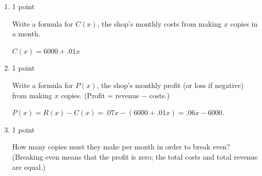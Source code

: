 \documentclass{article}
\begin{document}
\begin{enumerate}
\begin{enumerate}
    \begin{problem}[\vfill]
      Write a formula for $R(x)$, the shop's monthly revenue from
      making $x$ copies in a month.
    \end{problem}

    \begin{solution} 
      $\boxed{R(x) = .07 x}$ 
    \end{solution}

  \item

    \begin{grading}
      1 point
    \end{grading}

    \begin{problem}[\vfill]
      Write a formula for $C(x)$, the shop's monthly costs from making
      $x$ copies in a month.
    \end{problem}

    \begin{solution} 
      $\boxed{ C(x) = 6000+.01x}$
    \end{solution}

  \item

    \begin{grading}
      1 point
    \end{grading}    

    \begin{problem}[\vfill]
      Write a formula for $P(x)$, the shop's monthly profit (or loss
      if negative) from making $x$ copies. (Profit = revenue $-$
      costs.) 
    \end{problem}

    \begin{solution} 
      $P(x) = R(x) - C(x) = .07x - (6000 +.01x) = \boxed{.06x -6000}$. 
    \end{solution}

  \item

    \begin{grading}
      1 point
    \end{grading}

    \begin{problem}[\nstretch{3}]
      How many copies must they make per month in order to break even?
      (Breaking even means that the profit is zero; the total costs
      and total revenue are equal.)
    \end{problem}


\end{enumerate}
\end{enumerate}
\end{document}
